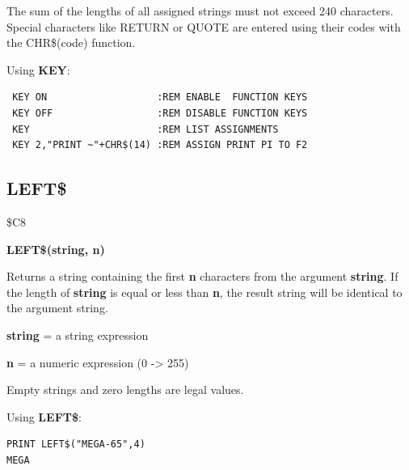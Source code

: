 \begin{description}[leftmargin=2cm,style=nextline]
\item [Remarks:] The sum of the lengths of all assigned strings
                 must not exceed 240 characters.
                 Special characters like RETURN or QUOTE are entered
                 using their codes with the CHR\$(code) function.
\item [Example:] Using {\bf KEY}:
\begin{tcolorbox}[colback=black,coltext=white]
\verbatimfont{\codefont}
\begin{verbatim}
 KEY ON                   :REM ENABLE  FUNCTION KEYS
 KEY OFF                  :REM DISABLE FUNCTION KEYS
 KEY                      :REM LIST ASSIGNMENTS
 KEY 2,"PRINT ~"+CHR$(14) :REM ASSIGN PRINT PI TO F2
\end{verbatim}
\end{tcolorbox}
\end{description}


\newpage
\subsection{LEFT\$}
\begin{description}[leftmargin=2cm,style=nextline]
\item [Token:] \$C8
\item [Format:] {\bf LEFT\$(string, n)}
\item [Usage:] Returns a string
               containing the first {\bf n} characters from the
               argument {\bf string}.
               If the length of {\bf string} is equal or less than {\bf n},
               the result string will be identical to the argument string.

               {\bf string} = a string expression

               {\bf n} = a numeric expression (0 -> 255)

\item [Remarks:] Empty strings and zero lengths are legal values.

\item [Example:] Using {\bf LEFT\$}:
\begin{tcolorbox}[colback=black,coltext=white]
\verbatimfont{\codefont}
\begin{verbatim}
PRINT LEFT$("MEGA-65",4)
MEGA
\end{verbatim}
\end{tcolorbox}
\end{description}

